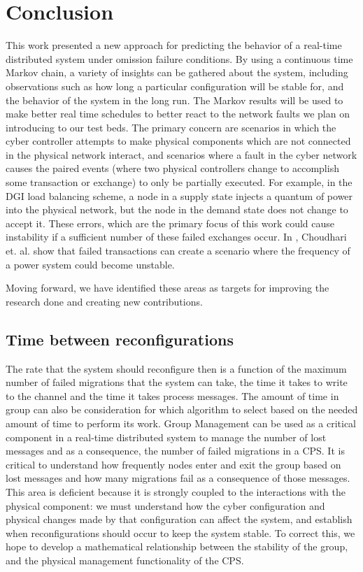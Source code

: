 \chapter{Conclusion}

This work presented a new approach for predicting the behavior of a real-time distributed system under omission failure conditions. By using a continuous time Markov chain, a variety of insights can be gathered about the system, including observations such as how long a particular configuration will be stable for, and the behavior of the system in the long run.  The Markov results will be used  to make better real time schedules to better react to the network faults we plan on introducing to our test beds. The primary concern are scenarios in which the cyber controller attempts to make physical components which are not connected in the physical network interact, and scenarios where a fault in the cyber network causes the paired events (where two physical controllers change to accomplish some transaction or exchange) to only be partially executed. For example, in the DGI load balancing scheme, a node in a supply state injects a quantum of power into the physical network, but the node in the demand state does not change to accept it. These errors, which are the primary focus of this work could cause instability if a sufficient number of these failed exchanges occur. In \cite{HARINI}, Choudhari et. al. show that failed transactions can create a scenario where the frequency of a power system could become unstable. 

Moving forward, we have identified these areas as targets for improving the research done and creating new contributions.

\section{Time between reconfigurations}

 The rate that the system should reconfigure then is a function of the maximum number of failed migrations that the system can take, the time it takes to write to the channel and the time it takes process messages. The amount of time in group can also be consideration for which algorithm to select based on the needed amount of time to perform its work. Group Management can be used as a critical component in a real-time distributed system to manage the number of lost messages and as a consequence, the number of failed migrations in a CPS. It is critical to understand how frequently nodes enter and exit the group based on lost messages and how many migrations fail as a consequence of those messages. This area is deficient because it is strongly coupled to the interactions with the physical component: we must understand how the cyber configuration and physical changes made by that configuration can affect the system, and establish when reconfigurations should occur to keep the system stable. To correct this, we hope to develop a mathematical relationship between the stability of the group, and the physical management functionality of the CPS.

